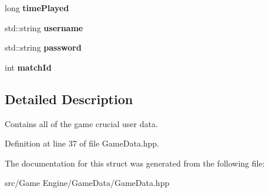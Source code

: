 \begin{DoxyCompactItemize}
\mbox{\label{struct_arktis_engine_1_1_user_data_a0feb00557b106da6b665a9f29c7f310c}} 
long {\bfseries time\+Played}
\item 
\mbox{\label{struct_arktis_engine_1_1_user_data_ae31685d0558480971f30bcbc8e5692d6}} 
std\+::string {\bfseries username}
\item 
\mbox{\label{struct_arktis_engine_1_1_user_data_a37e957d995296f58a9a1d73dcbdc28b7}} 
std\+::string {\bfseries password}
\item 
\mbox{\label{struct_arktis_engine_1_1_user_data_a9b77824051a41e722b061d04d599ffbb}} 
int {\bfseries match\+Id}
\end{DoxyCompactItemize}


\subsection{Detailed Description}
Contains all of the game crucial user data. 

\begin{DoxyVerb}\end{DoxyVerb}
 

Definition at line 37 of file Game\+Data.\+hpp.



The documentation for this struct was generated from the following file\+:\begin{DoxyCompactItemize}
\item 
src/\+Game Engine/\+Game\+Data/Game\+Data.\+hpp\end{DoxyCompactItemize}
